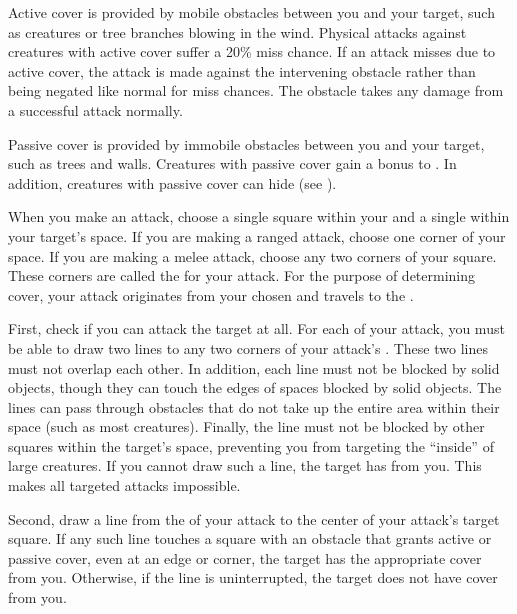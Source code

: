          Active cover is provided by mobile obstacles between you and your target, such as creatures or tree branches blowing in the wind.
        Physical attacks against creatures with active cover suffer a 20\% miss chance.
        If an attack misses due to active cover, the attack is made against the intervening obstacle rather than being negated like normal for miss chances.
        The obstacle takes any damage from a successful attack normally.

         Passive cover is provided by immobile obstacles between you and your target, such as trees and walls.
        Creatures with passive cover gain a  bonus to .
        In addition, creatures with passive cover can hide (see ).


        When you make an attack, choose a single square within your  and a single  within your target's space.
        If you are making a ranged attack, choose one corner of your space.
        If you are making a melee attack, choose any two corners of your square.
        These corners are called the  for your attack.
        For the purpose of determining cover, your attack originates from your chosen  and travels to the .

        First, check if you can attack the target at all.
        For each  of your attack, you must be able to draw two lines to any two corners of your attack's .
        These two lines must not overlap each other.
        In addition, each line must not be blocked by solid objects, though they can touch the edges of spaces blocked by solid objects.
        The lines can pass through obstacles that do not take up the entire area within their space (such as most creatures).
        Finally, the line must not be blocked by other squares within the target's space, preventing you from targeting the ``inside'' of large creatures.
        If you cannot draw such a line, the target has  from you.
        This makes all targeted attacks impossible.

        Second, draw a line from the  of your attack to the center of your attack's target square.
        If any such line touches a square with an obstacle that grants active or passive cover, even at an edge or corner, the target has the appropriate cover from you.
        Otherwise, if the line is uninterrupted, the target does not have cover from you.

